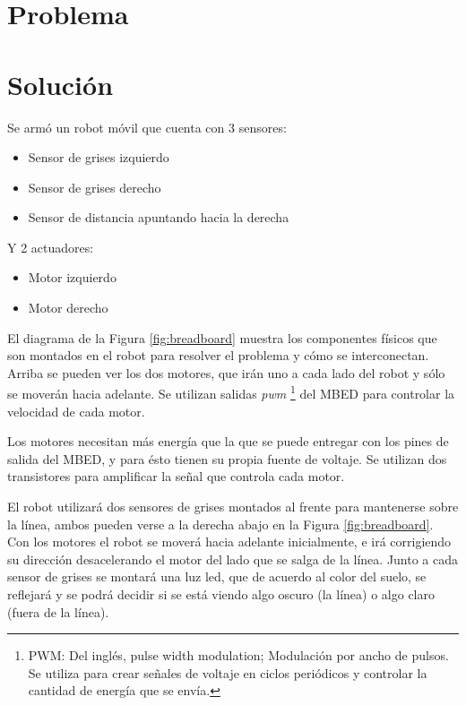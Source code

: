 

\section {Problema}


\section {Solución}

  Se armó un robot móvil que cuenta con 3 sensores:

\begin{itemize}
\item Sensor de grises izquierdo
\item Sensor de grises derecho
\item Sensor de distancia apuntando hacia la derecha
\end{itemize}

  Y 2 actuadores:

\begin{itemize}
\item Motor izquierdo
\item Motor derecho 
\end{itemize}



  El diagrama de la Figura \ref{fig:breadboard} muestra los
componentes físicos que son montados en el robot
para resolver el problema y cómo se interconectan.
  Arriba se pueden ver los dos motores, que irán uno a cada lado
del robot y sólo se moverán hacia adelante.
  Se utilizan salidas \textit{pwm} \footnote{PWM: Del inglés, pulse width
modulation; Modulación por ancho de pulsos. Se utiliza para crear señales
de voltaje en ciclos periódicos y controlar la cantidad de energía que
se envía.} del MBED para controlar la velocidad de cada motor.

  Los motores necesitan más energía que la que se puede entregar con
los pines de salida del MBED, y para ésto tienen su propia fuente de
voltaje.
  Se utilizan dos transistores para amplificar la señal que
controla cada motor.

  El robot utilizará dos sensores de grises montados al frente
para mantenerse sobre la línea, ambos pueden verse a la derecha abajo
en la Figura \ref{fig:breadboard}.
  Con los motores el robot se moverá hacia adelante inicialmente, e
irá corrigiendo su dirección desacelerando el motor del lado que
se salga de la línea.
  Junto a cada sensor de grises se montará una luz led, que de acuerdo
al color del suelo, se reflejará y se podrá decidir si se está viendo
algo oscuro (la línea) o algo claro (fuera de la línea).

